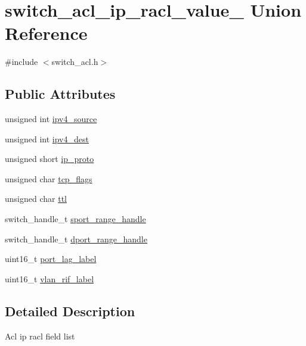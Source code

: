 \hypertarget{unionswitch__acl__ip__racl__value__}{\section{switch\+\_\+acl\+\_\+ip\+\_\+racl\+\_\+value\+\_\+ Union Reference}
\label{unionswitch__acl__ip__racl__value__}
}


{\ttfamily \#include $<$switch\+\_\+acl.\+h$>$}

\subsection*{Public Attributes}
\begin{DoxyCompactItemize}
\item 
unsigned int \hyperlink{unionswitch__acl__ip__racl__value___aecfd414a420eaad3e04c7d9179bfa86f}{ipv4\+\_\+source}
\item 
unsigned int \hyperlink{unionswitch__acl__ip__racl__value___a581a1cdf1dfb3bcfb547ba2352bcfbfe}{ipv4\+\_\+dest}
\item 
unsigned short \hyperlink{unionswitch__acl__ip__racl__value___aa5879bd65c28bb79c176004c352453a9}{ip\+\_\+proto}
\item 
unsigned char \hyperlink{unionswitch__acl__ip__racl__value___a62db9949930bb1f7ae88c7db7c34b923}{tcp\+\_\+flags}
\item 
unsigned char \hyperlink{unionswitch__acl__ip__racl__value___a535bac7d00079c64c5682630caca7a60}{ttl}
\item 
switch\+\_\+handle\+\_\+t \hyperlink{unionswitch__acl__ip__racl__value___ac9abcfb8557ba18c11e6d5156144d17a}{sport\+\_\+range\+\_\+handle}
\item 
switch\+\_\+handle\+\_\+t \hyperlink{unionswitch__acl__ip__racl__value___a62f306e188adf6103ffcf603c967b9e6}{dport\+\_\+range\+\_\+handle}
\item 
uint16\+\_\+t \hyperlink{unionswitch__acl__ip__racl__value___a9a18b121277c1d384320fe0736568e26}{port\+\_\+lag\+\_\+label}
\item 
uint16\+\_\+t \hyperlink{unionswitch__acl__ip__racl__value___a41e9fbb598ff26c97f7276fcfbbcbfdb}{vlan\+\_\+rif\+\_\+label}
\end{DoxyCompactItemize}


\subsection{Detailed Description}
Acl ip racl field list 

